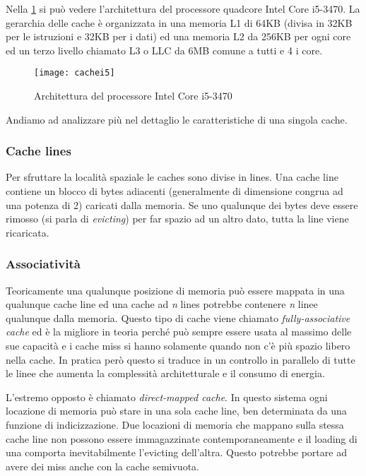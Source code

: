 			Nella \cref{fig:cachei5} si può vedere l'architettura del processore quadcore Intel Core i5-3470. La gerarchia delle cache è organizzata in una memoria L1 di 64KB (divisa in 32KB per le istruzioni e 32KB per i dati) ed una memoria L2 da 256KB per ogni core ed un terzo livello chiamato L3 o \ac{LLC} da 6MB comune a tutti e 4 i core.
			
			\begin{figure}
				\begin{center}
					\texttt{[image: cachei5]}
					\caption{Architettura del processore Intel Core i5-3470}
					\label{fig:cachei5}
				\end{center}
			\end{figure}
			
			Andiamo ad analizzare più nel dettaglio le caratteristiche di una singola cache\cite{ge2016survey,yarom2014flush+}.
			
			\subsubsection{Cache lines}
				Per sfruttare la località spaziale le caches sono divise in lines. Una cache line contiene un blocco di bytes adiacenti (generalmente di dimensione congrua ad una potenza di 2) caricati dalla memoria. Se uno qualunque dei bytes deve essere rimosso (si parla di \emph{evicting}) per far spazio ad un altro dato, tutta la line viene ricaricata.
				
			\subsubsection{Associatività}
				Teoricamente una qualunque posizione di memoria può essere mappata in una qualunque cache line ed una cache ad \emph{n} lines potrebbe contenere \emph{n} linee qualunque dalla memoria. Questo tipo di cache viene chiamato \emph{fully-associative cache} ed è la migliore in teoria perché può sempre essere usata al massimo delle sue capacità e i cache miss si hanno solamente quando non c'è più spazio libero nella cache. In pratica però questo si traduce in un controllo in parallelo di tutte le linee che aumenta la complessità architetturale e il consumo di energia.
				
				L'estremo opposto è chiamato \emph{direct-mapped cache}. In questo sistema ogni locazione di memoria può stare in una sola cache line, ben determinata da una funzione di indicizzazione. Due locazioni di memoria che mappano sulla stessa cache line non possono essere immagazzinate contemporaneamente e il loading di una comporta inevitabilmente l'evicting dell'altra. Questo potrebbe portare ad avere dei miss anche con la cache semivuota.
				
